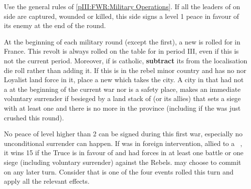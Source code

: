 \begin{digressions}



  \phmil
  \aparag Use the general rules of \ref{pIII:FWR:Military Operations}.
  \aparag If all the leaders of on side are captured, wounded or killed, this
  side signs a level 1 peace in favour of its enemy at the end of the round.

  \aparag At the beginning of each military round (except the first), a new
  \REVOLT is rolled for in France.
  \bparag This revolt is always rolled on the table for \FRA in period III,
  even if this is not the current period. Moreover, if \FRA is catholic,
  \textbf{subtract} its \STAB from the localisation die roll rather than
  adding it.
  \bparag If this \REVOLT is in the rebel minor country and has no \REVOLT nor
  Loyalist land force in it, place a new \REVOLT \facemoins which takes the
  city.
  \aparag A city in \FRA that had not a \REVOLT \faceplus at the beginning of
  the current war nor is a safety place, makes an immediate voluntary
  surrender if besieged by a land stack of \FRA (or its allies) that sets a
  siege with at least one \ARMY \faceplus and there is no more \REVOLT in the
  province (including if the \REVOLT was just crushed this round).



  \phpaix
  \aparag No peace of level higher than 2 can be signed during this first war,
  especially no unconditional surrender can happen.
  \aparag If \LIG was in foreign intervention, allied to a \CATHCR\ \FRA, it
  wins 15 \PV if the Truce is in favour of \FRA and \LIG had forces in at
  least one battle or one siege (including voluntary surrender) against the
  Rebels.
  \aparag \FRA may choose to commit  on any
  later turn. Consider that  is one of the four
  events rolled this turn and apply all the relevant effects.





\end{digressions}
